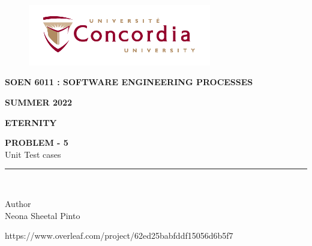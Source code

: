 \documentclass[letterpaper, 11pt]{article}
\begin{document}
\begin{titlepage}
\vspace*{0.7in}
\begin{center}
\begin{figure}[htb]
\begin{center}
\includegraphics[width=8cm]{univ_logo}
\end{center}
\end{figure}
\vspace*{0.3in}
\begin{Large}
\textbf{SOEN 6011 : SOFTWARE ENGINEERING PROCESSES} \\
\end{Large}
\vspace*{0.1in}
\begin{Large}
\textbf{SUMMER 2022} \\
\end{Large}
\vspace*{0.9in}
\begin{Large}
\textbf{ETERNITY} \\
\end{Large}
\vspace*{0.9in}
\begin{Large} 


\textbf{PROBLEM - 5} \\
Unit Test cases \\
\end{Large}
\vspace*{0.625in}
\rule{80mm}{0.1mm}\\
\vspace*{0.1in}
\begin{large}
Author \\
\vspace*{0.1in}
Neona Sheetal Pinto\\
\vspace*{1.0in}
\date{\normalsize\today} 
\end{large}
\end{center}
\begin{center}
https://www.overleaf.com/project/62ed25babfddf15056d6b5f7\end{center}
\end{titlepage}
\tableofcontents
\listoffigures
\newpage
\end{document}
